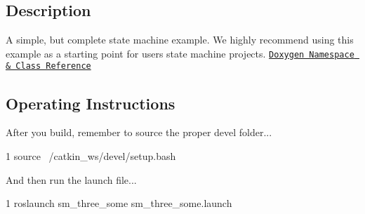 \subsection*{Description}

A simple, but complete state machine example. We highly recommend using this example as a starting point for users state machine projects. \href{https://reelrbtx.github.io/SMACC/master/html/namespacesm__three__some.html}{\tt Doxygen Namespace \& Class Reference}

\subsection*{Operating Instructions}

After you build, remember to source the proper devel folder...


\begin{DoxyCode}
1 source ~/catkin\_ws/devel/setup.bash
\end{DoxyCode}


And then run the launch file...


\begin{DoxyCode}
1 roslaunch sm\_three\_some sm\_three\_some.launch
\end{DoxyCode}
 
